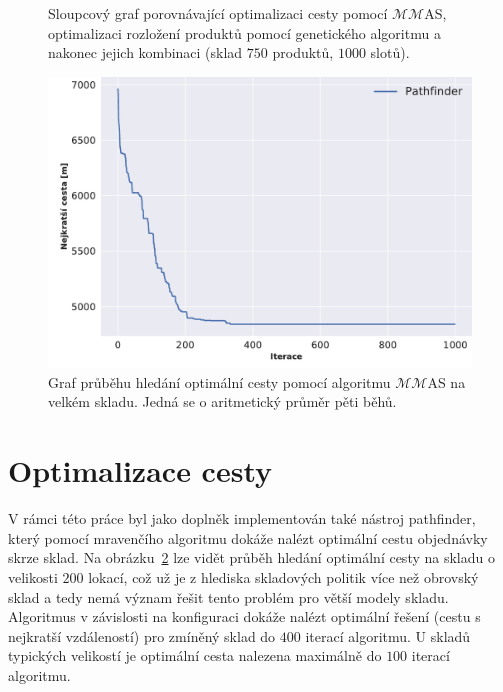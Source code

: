 \begin{figure}[t]
\begin{minipage}{0.49\textwidth}
        \caption{Sloupcový graf porovnávající optimalizaci cesty pomocí $\mathcal{M}\!\!\mathcal{M}$AS, optimalizaci rozložení produktů pomocí genetického algoritmu a nakonec jejich kombinaci (sklad $750$ produktů, $1000$ slotů).}
        \label{fig:vyhodnoceniPorovnaniOpt7501000}
    \end{minipage}\hfill
\end{figure}
\begin{figure}[t!]
    \centering
    \includegraphics[width=0.7\linewidth]{figures/vyhodnoceni/plotPathFinder.pdf}
    \caption{Graf průběhu hledání optimální cesty pomocí algoritmu $\mathcal{M}\!\!\mathcal{M}$AS na velkém skladu. Jedná se o aritmetický průměr pěti běhů.}
    \label{fig:vyhodnoceniPathFinder}
\end{figure}

\section{Optimalizace cesty}
V rámci této práce byl jako doplněk implementován také nástroj pathfinder, který pomocí mravenčího algoritmu dokáže nalézt optimální cestu objednávky skrze sklad. Na obrázku~\ref{fig:vyhodnoceniPathFinder} lze vidět průběh hledání optimální cesty na skladu o velikosti $200$ lokací, což už je z hlediska skladových politik více než obrovský sklad a tedy nemá význam řešit tento problém pro větší modely skladu. Algoritmus v závislosti na konfiguraci dokáže nalézt optimální řešení (cestu s nejkratší vzdáleností) pro zmíněný sklad do $400$ iterací algoritmu. U skladů typických velikostí je optimální cesta nalezena maximálně do $100$ iterací algoritmu.

